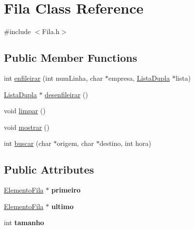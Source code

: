 \hypertarget{classFila}{\section{\-Fila \-Class \-Reference}
\label{classFila}
}


{\ttfamily \#include $<$\-Fila.\-h$>$}

\subsection*{\-Public \-Member \-Functions}
\begin{DoxyCompactItemize}
\item 
int \hyperlink{classFila_a7e05da16d38699987e60e54371c6e775}{enfileirar} (int num\-Linha, char $\ast$empresa, \hyperlink{classListaDupla}{\-Lista\-Dupla} $\ast$lista)
\item 
\hyperlink{classListaDupla}{\-Lista\-Dupla} $\ast$ \hyperlink{classFila_a81aa8ac237a3202862fe0f8dfaa1ecb7}{desenfileirar} ()
\item 
void \hyperlink{classFila_aa16f0272d183b2138a7e073beb750d99}{limpar} ()
\item 
void \hyperlink{classFila_ad3287e330b085067454db700229b6201}{mostrar} ()
\item 
int \hyperlink{classFila_a46909d036a60e134221715be69eed2e0}{buscar} (char $\ast$origem, char $\ast$destino, int hora)
\end{DoxyCompactItemize}
\subsection*{\-Public \-Attributes}
\begin{DoxyCompactItemize}
\item 
\hypertarget{classFila_a207e2c051b9986d677789e18e6e40f7c}{\hyperlink{classElementoFila}{\-Elemento\-Fila} $\ast$ {\bfseries primeiro}}\label{classFila_a207e2c051b9986d677789e18e6e40f7c}

\item 
\hypertarget{classFila_a4d4213a5c61bc598dec6b792724b64ea}{\hyperlink{classElementoFila}{\-Elemento\-Fila} $\ast$ {\bfseries ultimo}}\label{classFila_a4d4213a5c61bc598dec6b792724b64ea}

\item 
\hypertarget{classFila_a46bbd844d92a49df2f9f1dff542301db}{int {\bfseries tamanho}}\label{classFila_a46bbd844d92a49df2f9f1dff542301db}

\end{DoxyCompactItemize}


